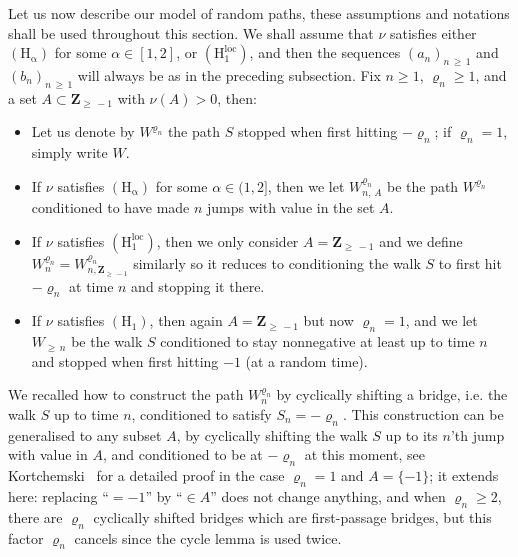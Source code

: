 \documentclass[10pt]{amsart}
\theoremstyle{definition}\newtheorem{defi}[theo]{Definition}\newtheorem{rema}[theo]{Remark}\newtheorem{exam}[theo]{Example}\newtheorem{exem}[theo]{Example}\newtheorem{nota}[theo]{Notation}
\newcommand{\ensembles}[1]{\mathbf{#1}}
\newcommand{\Z}{\ensembles{Z}}
\newcommand{\1}{\ensembles{1}}
\renewcommand{\ge}{\geqslant}
\newcommand{\Hrm}{\mathrm{H}}
\newcommand{\Hrmloc}{\mathrm{(H_1^{loc})}}
\newcommand{\Hrmalp}{\mathrm{(H_\alpha)}}
\providecommand{\?}{}
\begin{document}
Let us now describe our model of random paths, these assumptions and notations shall be used throughout this section. We shall assume that $\nu$ satisfies either $\Hrmalp$ for some $\alpha \in [1,2]$, or $\Hrmloc$, and then the sequences $(a_n)_{n\,\ge\,1}$ and $(b_n)_{n\,\ge\,1}$ will always be as in the preceding subsection. Fix $n \ge 1$, $\varrho_n \ge 1$, and a set $A \subset \Z_{\ge\,-1}$ with $\nu(A) > 0$, then:
\begin{itemize}
\item Let us denote by $W^{\varrho_n}$ the path $S$ stopped when first hitting $-\varrho_n$; if $\varrho_n = 1$, simply write $W$.

\item If $\nu$ satisfies $\Hrmalp$ for some $\alpha \in (1,2]$, then we let $W^{\varrho_n}_{n,\,A}$ be the path $W^{\varrho_n}$ conditioned to have made $n$ jumps with value in the set $A$.

\item If $\nu$ satisfies $\Hrmloc$, then we only consider $A = \Z_{\ge\,-1}$ and we define $W^{\varrho_n}_n=W^{\varrho_n}_{n,\Z_{\ge\,-1}}$ similarly so it reduces to conditioning the walk $S$ to first hit $-\varrho_n$ at time $n$ and stopping it there.

\item If $\nu$ satisfies $(\Hrm_1)$, then again $A = \Z_{\ge\,-1}$ but now $\varrho_n = 1$, and we let $W_{\ge\,n}$ be the walk $S$ conditioned to stay nonnegative at least up to time $n$ and stopped when first hitting $-1$ (at a random time).
\end{itemize}
We recalled how to construct the path $W^{\varrho_n}_{n}$ by cyclically shifting a bridge, i.e. the walk $S$ up to time $n$, conditioned to satisfy $S_n = -\varrho_n$. This construction can be generalised to any subset $A$, by cyclically shifting the walk $S$ up to its $n$'th jump with value in $A$, and conditioned to be at $-\varrho_n$ at this moment, see Kortchemski~\cite[Lemma~6.4]{Kor12} for a detailed proof in the case $\varrho_n = 1$ and $A = \{-1\}$; it extends here: replacing ``$=-1$'' by ``$\in A$'' does not change anything, and when $\varrho_n \ge 2$, there are $\varrho_n$ cyclically shifted bridges which are first-passage bridges, but this factor $\varrho_n$ cancels since the cycle lemma is used twice.
\end{document}
